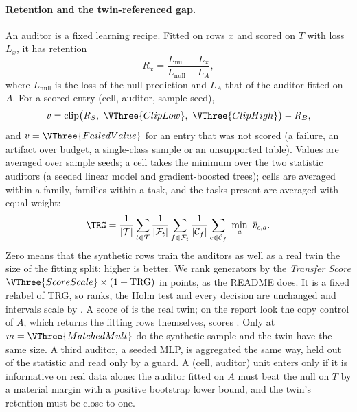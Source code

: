 \paragraph{Retention and the twin-referenced gap.}
An auditor is a fixed learning recipe.
Fitted on rows $x$ and scored on $T$ with loss $L_x$, it has retention
\begin{equation}\label{eq:retention}
  R_x = \frac{L_{\mathrm{null}} - L_x}{L_{\mathrm{null}} - L_A},
\end{equation}
where $L_{\mathrm{null}}$ is the loss of the null prediction and $L_A$ that of the auditor fitted on $A$.
For a scored entry (cell, auditor, sample seed),
\begin{equation}\label{eq:entry}
  v = \operatorname{clip}\bigl(R_S,\ \VThree{ClipLow},\ \VThree{ClipHigh}\bigr) - R_B ,
\end{equation}
and $v=\VThree{FailedValue}$ for an entry that was not scored (a failure, an artifact over budget, a single-class sample or an unsupported table).
Values are averaged over sample seeds; a cell takes the minimum over the two statistic auditors (a seeded linear model and gradient-boosted trees); cells are averaged within a family, families within a task, and the tasks present are averaged with equal weight:
\begin{equation}\label{eq:trg}
  \TRG = \frac{1}{|\mathcal T|}\sum_{t\in\mathcal T}\frac{1}{|\mathcal F_t|}\sum_{f\in\mathcal F_t}\frac{1}{|\mathcal C_f|}\sum_{c\in\mathcal C_f}\ \min_{a}\ \bar v_{c,a}.
\end{equation}
Zero means that the synthetic rows train the auditors as well as a real twin the size of the fitting split; higher is better. We rank generators by the \emph{Transfer Score} $\VThree{ScoreScale}\times(1+\mathrm{TRG})$ in points, as the README does. It is a fixed relabel of TRG, so ranks, the Holm test and every decision are unchanged and intervals scale by . A score of  is the real twin; on the report look the copy control of $A$, which returns the fitting rows themselves, scores . Only at $m=\VThree{MatchedMult}$ do the synthetic sample and the twin have the same size.
A third auditor, a seeded MLP, is aggregated the same way, held out of the statistic and read only by a guard.
A (cell, auditor) unit enters only if it is informative on real data alone: the auditor fitted on $A$ must beat the null on $T$ by a material margin with a positive bootstrap lower bound, and the twin's retention must be close to one.

